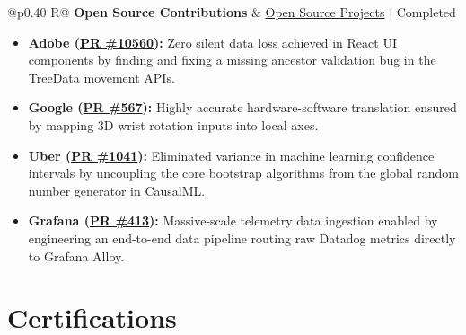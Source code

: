 \documentclass[a4paper,10pt]{article}
\newcommand{\ulink}[2]{\href{#1}{#2}}
\newcommand{\subheading}[1]{{\color[HTML]{0A0A0A}\fontsize{12}{14}\selectfont\bfseries #1}}
\newcommand{\meta}[1]{{\color[HTML]{5C5C5C}\fontsize{10.5}{12.5}\selectfont #1}}
\begin{document}
\vspace{4pt}
\begin{tabularx}{\linewidth}{@{}p{0.40\linewidth} R@{}}
\subheading{Open Source Contributions} & \meta{\ulink{https://github.com/su-jin1425/My-Open-Source-Contributions}{Open Source Projects} $|$ Completed}
\end{tabularx}
\begin{itemize}[nosep, leftmargin=1.5em, itemsep=2pt, topsep=2pt]
  \item {\color[HTML]{0A0A0A}\fontsize{11}{14}\selectfont \textbf{Adobe (\ulink{https://github.com/adobe/react-spectrum/pull/10560}{PR \#10560}):} Zero silent data loss achieved in React UI components by finding and fixing a missing ancestor validation bug in the TreeData movement APIs.}
  \item {\color[HTML]{0A0A0A}\fontsize{11}{14}\selectfont \textbf{Google (\ulink{https://github.com/google/xrblocks/pull/567}{PR \#567}):} Highly accurate hardware-software translation ensured by mapping 3D wrist rotation inputs into local axes.}
  \item {\color[HTML]{0A0A0A}\fontsize{11}{14}\selectfont \textbf{Uber (\ulink{https://github.com/uber/causalml/pull/1041}{PR \#1041}):} Eliminated variance in machine learning confidence intervals by uncoupling the core bootstrap algorithms from the global random number generator in CausalML.}
  \item {\color[HTML]{0A0A0A}\fontsize{11}{14}\selectfont \textbf{Grafana (\ulink{https://github.com/grafana/alloy-scenarios/pull/413}{PR \#413}):} Massive-scale telemetry data ingestion enabled by engineering an end-to-end data pipeline routing raw Datadog metrics directly to Grafana Alloy.}
\end{itemize}

\section{Certifications}
\vspace{2pt}
\end{document}
